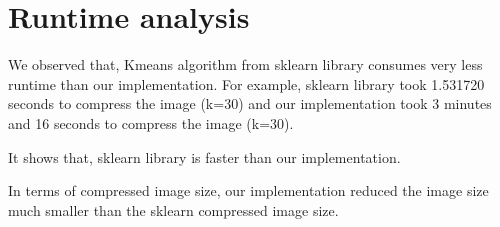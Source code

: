 \documentclass[11pt]{article}
\begin{document}
    \section{Runtime analysis}\label{runtime-analysis}

We observed that, Kmeans algorithm from sklearn library consumes very
less runtime than our implementation. For example, sklearn library took
1.531720 seconds to compress the image (k=30) and our implementation
took 3 minutes and 16 seconds to compress the image (k=30).

It shows that, sklearn library is faster than our implementation.

In terms of compressed image size, our implementation reduced the image
size much smaller than the sklearn compressed image size.


    
    
    
    
\end{document}
